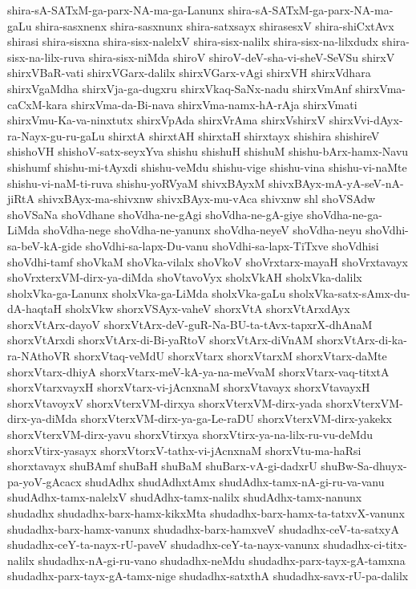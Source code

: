 {shira-sA-SATxM-ga-parx-NA-ma-ga-Lanunx
shira-sA-SATxM-ga-parx-NA-ma-gaLu
shira-sasxnenx
shira-sasxnunx
shira-satxsayx
shirasesxV
shira-shiCxtAvx
shirasi
shira-sisxna
shira-sisx-nalelxV
shira-sisx-nalilx
shira-sisx-na-lilxdudx
shira-sisx-na-lilx-ruva
shira-sisx-niMda
shiroV
shiroV-deV-sha-vi-sheV-SeVSu
shirxV
shirxVBaR-vati
shirxVGarx-dalilx
shirxVGarx-vAgi
shirxVH
shirxVdhara
shirxVgaMdha
shirxVja-ga-dugxru
shirxVkaq-SaNx-nadu
shirxVmAnf
shirxVma-caCxM-kara
shirxVma-da-Bi-nava
shirxVma-namx-hA-rAja
shirxVmati
shirxVmu-Ka-va-ninxtutx
shirxVpAda
shirxVrAma
shirxVshirxV
shirxVvi-dAyx-ra-Nayx-gu-ru-gaLu
shirxtA
shirxtAH
shirxtaH
shirxtayx
shishira
shishireV
shishoVH
shishoV-satx-seyxYva
shishu
shishuH
shishuM
shishu-bArx-hamx-Navu
shishumf
shishu-mi-tAyxdi
shishu-veMdu
shishu-vige
shishu-vina
shishu-vi-naMte
shishu-vi-naM-ti-ruva
shishu-yoRVyaM
shivxBAyxM
shivxBAyx-mA-yA-seV-nA-jiRtA
shivxBAyx-ma-shivxnw
shivxBAyx-mu-vAca
shivxnw
shl
shoVSAdw
shoVSaNa
shoVdhane
shoVdha-ne-gAgi
shoVdha-ne-gA-giye
shoVdha-ne-ga-LiMda
shoVdha-nege
shoVdha-ne-yanunx
shoVdha-neyeV
shoVdha-neyu
shoVdhi-sa-beV-kA-gide
shoVdhi-sa-lapx-Du-vanu
shoVdhi-sa-lapx-TiTxve
shoVdhisi
shoVdhi-tamf
shoVkaM
shoVka-vilalx
shoVkoV
shoVrxtarx-mayaH
shoVrxtavayx
shoVrxterxVM-dirx-ya-diMda
shoVtavoVyx
sholxVkAH
sholxVka-dalilx
sholxVka-ga-Lanunx
sholxVka-ga-LiMda
sholxVka-gaLu
sholxVka-satx-sAmx-du-dA-haqtaH
sholxVkw
shorxVSAyx-vaheV
shorxVtA
shorxVtArxdAyx
shorxVtArx-dayoV
shorxVtArx-deV-guR-Na-BU-ta-tAvx-tapxrX-dhAnaM
shorxVtArxdi
shorxVtArx-di-Bi-yaRtoV
shorxVtArx-diVnAM
shorxVtArx-di-ka-ra-NAthoVR
shorxVtaq-veMdU
shorxVtarx
shorxVtarxM
shorxVtarx-daMte
shorxVtarx-dhiyA
shorxVtarx-meV-kA-ya-na-meVvaM
shorxVtarx-vaq-titxtA
shorxVtarxvayxH
shorxVtarx-vi-jAcnxnaM
shorxVtavayx
shorxVtavayxH
shorxVtavoyxV
shorxVterxVM-dirxya
shorxVterxVM-dirx-yada
shorxVterxVM-dirx-ya-diMda
shorxVterxVM-dirx-ya-ga-Le-raDU
shorxVterxVM-dirx-yakekx
shorxVterxVM-dirx-yavu
shorxVtirxya
shorxVtirx-ya-na-lilx-ru-vu-deMdu
shorxVtirx-yasayx
shorxVtorxV-tathx-vi-jAcnxnaM
shorxVtu-ma-haRsi
shorxtavayx
shuBAmf
shuBaH
shuBaM
shuBarx-vA-gi-dadxrU
shuBw-Sa-dhuyx-pa-yoV-gAcacx
shudAdhx
shudAdhxtAmx
shudAdhx-tamx-nA-gi-ru-va-vanu
shudAdhx-tamx-nalelxV
shudAdhx-tamx-nalilx
shudAdhx-tamx-nanunx
shudadhx
shudadhx-barx-hamx-kikxMta
shudadhx-barx-hamx-ta-tatxvX-vanunx
shudadhx-barx-hamx-vanunx
shudadhx-barx-hamxveV
shudadhx-ceV-ta-satxyA
shudadhx-ceY-ta-nayx-rU-paveV
shudadhx-ceY-ta-nayx-vanunx
shudadhx-ci-titx-nalilx
shudadhx-nA-gi-ru-vano
shudadhx-neMdu
shudadhx-parx-tayx-gA-tamxna
shudadhx-parx-tayx-gA-tamx-nige
shudadhx-satxthA
shudadhx-savx-rU-pa-dalilx
}
